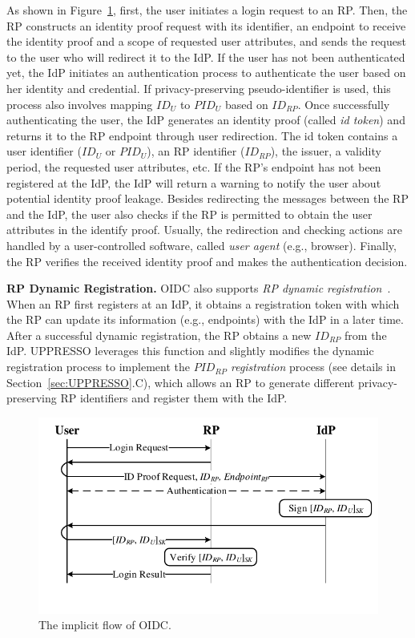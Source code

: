 As shown in Figure~\ref{fig:OpenID}, first, the user initiates a login request to an RP. Then, the RP constructs an identity proof request with its identifier, an endpoint to receive the identity proof and a scope of requested user attributes, and sends the request to the user who will redirect it to the IdP. If the user has not been authenticated yet, the IdP initiates an authentication process to authenticate the user based on her identity and credential. If privacy-preserving pseudo-identifier is used, this process also involves mapping $ID_U$ to $PID_U$ based on $ID_{RP}$. Once successfully authenticating the user, the IdP generates an identity proof (called {\em id token}) and returns it to the RP endpoint through user redirection. The id token contains a user identifier ($ID_U$ or $PID_U$), an RP identifier ($ID_{RP}$), the issuer, a validity period, the requested user attributes, etc. If the RP's endpoint has not been registered at the IdP, the IdP will return a warning to notify the user about potential identity proof leakage. Besides redirecting the messages between the RP and the IdP, the user also checks if the RP is permitted to obtain the user attributes in the identify proof. Usually, the redirection and checking actions are handled by a user-controlled software, called {\em user agent} (e.g., browser). Finally, the RP verifies the received identity proof and makes the authentication decision.

\noindent\textbf{RP Dynamic Registration.}
OIDC also supports {\em RP dynamic registration}~\cite{DynamicRegistration}. When an RP first registers at an IdP, it obtains a registration token with which the RP can %
update its information (e.g., endpoints) with the IdP in a later time. After a successful dynamic registration, the RP obtains a new $ID_{RP}$ from the IdP.
UPPRESSO leverages this function and slightly modifies the dynamic registration process to implement the {\em $PID_{RP}$ registration} process (see details in Section~\ref{sec:UPPRESSO}.C), which allows an RP to generate different privacy-preserving RP identifiers and register them with the IdP.

\begin{figure}[t]
  \centering
  \includegraphics[width=0.95\linewidth]{fig/OIDC1.pdf}
  \caption{The implicit flow of OIDC.}
  \label{fig:OpenID}
\end{figure}


